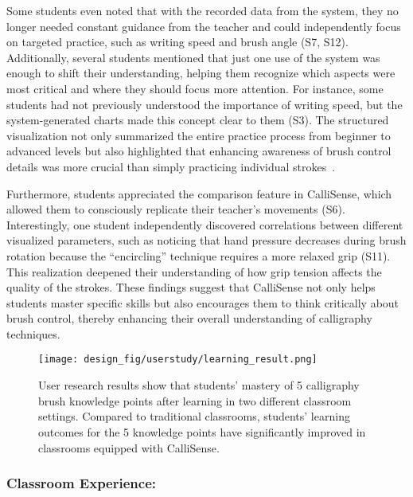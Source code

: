 Some students even noted that with the recorded data from the system, they no longer needed constant guidance from the teacher and could independently focus on targeted practice, such as writing speed and brush angle (S7, S12). Additionally, several students mentioned that just one use of the system was enough to shift their understanding, helping them recognize which aspects were most critical and where they should focus more attention. For instance, some students had not previously understood the importance of writing speed, but the system-generated charts made this concept clear to them (S3). The structured visualization not only summarized the entire practice process from beginner to advanced levels but also highlighted that enhancing awareness of brush control details was more crucial than simply practicing individual strokes~\cite{zhang2023bringing}.

Furthermore, students appreciated the comparison feature in CalliSense, which allowed them to consciously replicate their teacher's movements (S6). Interestingly, one student independently discovered correlations between different visualized parameters, such as noticing that hand pressure decreases during brush rotation because the ``encircling'' technique requires a more relaxed grip (S11). This realization deepened their understanding of how grip tension affects the quality of the strokes. These findings suggest that CalliSense not only helps students master specific skills but also encourages them to think critically about brush control, thereby enhancing their overall understanding of calligraphy techniques.

\begin{figure}[t]
    \centering
    \texttt{[image: design\_fig/userstudy/learning\_result.png]}
    \caption{User research results show that students' mastery of 5 calligraphy brush knowledge points after learning in two different classroom settings. Compared to traditional classrooms, students' learning outcomes for the 5 knowledge points have significantly improved in classrooms equipped with CalliSense.}
    \label{fig:knowledge points test}
\end{figure}


\subsubsection{Classroom Experience:}

